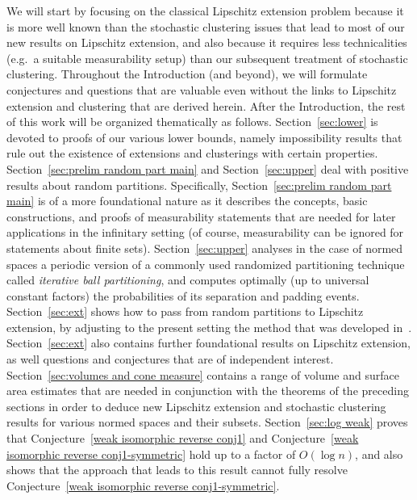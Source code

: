 \documentclass[11pt,reqno]{amsart}
\theoremstyle{remark}
\renewcommand{\1}{\mathbf 1}
\begin{document}
We will start by focusing on the classical Lipschitz extension problem because it is more well known than the stochastic clustering issues that lead to most of our new results on Lipschitz extension, and also because it requires less technicalities (e.g.~a suitable measurability setup) than our subsequent treatment of stochastic clustering. Throughout the Introduction (and beyond), we will formulate conjectures and questions that are valuable even without the links to Lipschitz extension and clustering that are derived herein. After the Introduction, the rest of this work will be organized thematically as follows. Section~\ref{sec:lower} is devoted to proofs of our various lower bounds, namely impossibility results that rule out the existence of extensions and clusterings with certain properties. Section~\ref{sec:prelim random part main} and Section~\ref{sec:upper} deal with positive results about random partitions. Specifically, Section~\ref{sec:prelim random part main} is of a more foundational nature as it describes the concepts, basic constructions, and proofs of measurability statements that are needed for later applications in the infinitary setting (of course, measurability can be ignored  for statements about finite sets). Section~\ref{sec:upper} analyses in the case of normed spaces a periodic version of a commonly used   randomized partitioning technique called {\em iterative ball partitioning}, and computes optimally (up to universal constant factors) the probabilities of its separation and padding events. Section~\ref{sec:ext} shows how to pass from random partitions to Lipschitz extension, by adjusting to the present setting the method that was developed in~\cite{LN05}.  Section~\ref{sec:ext}  also contains further foundational results on Lipschitz extension, as well questions and conjectures that are of independent interest. Section~\ref{sec:volumes and cone measure} contains a range of volume and surface area estimates that are needed in conjunction with the theorems of the preceding sections in order to deduce new Lipschitz extension and stochastic clustering results for various normed spaces and their subsets. Section~\ref{sec:log weak} proves that Conjecture~\ref{weak isomorphic reverse conj1}  and Conjecture~\ref{weak isomorphic reverse conj1-symmetric} hold up to a factor of $O(\log n)$, and also shows that the approach that leads to this result cannot fully resolve Conjecture~\ref{weak isomorphic reverse conj1-symmetric}.
\end{document}
